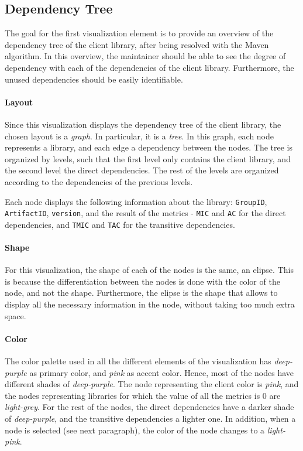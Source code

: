 \subsection{Dependency Tree}
The goal for the first visualization element is to provide an overview of the dependency tree of the client library, after being resolved with the Maven algorithm. In this overview, the maintainer should be able to see the degree of dependency with each of the dependencies of the client library. Furthermore, the unused dependencies should be easily identifiable. %

\paragraph{Layout}
Since this visualization displays the dependency tree of the client library, the chosen layout is a \textit{graph}. In particular, it is a \textit{tree}. In this graph, each node represents a library, and each edge a dependency between the nodes. The tree is organized by levels, such that the first level only contains the client library, and the second level the direct dependencies. The rest of the levels are organized according to the dependencies of the previous levels.

Each node displays the following information about the library: \texttt{GroupID}, \texttt{ArtifactID}, \texttt{version}, and the result of the metrics - \texttt{MIC} and \texttt{AC} for the direct dependencies, and \texttt{TMIC} and \texttt{TAC} for the transitive dependencies.

\paragraph{Shape}
For this visualization, the shape of each of the nodes is the same, an elipse. This is because the differentiation between the nodes is done with the color of the node, and not the shape. Furthermore, the elipse is the shape that allows to display all the necessary information in the node, without taking too much extra space.

\paragraph{Color}
The color palette used in all the different elements of the visualization has \textit{deep-purple} as primary color, and \textit{pink} as accent color. Hence, most of the nodes have different shades of \textit{deep-purple}. The node representing the client color is \textit{pink}, and the nodes representing libraries for which the value of all the metrics is 0 are \textit{light-grey}. For the rest of the nodes, the direct dependencies have a darker shade of \textit{deep-purple}, and the transitive dependencies a lighter one. 
In addition, when a node is selected (see next paragraph), the color of the node changes to a \textit{light-pink}.

